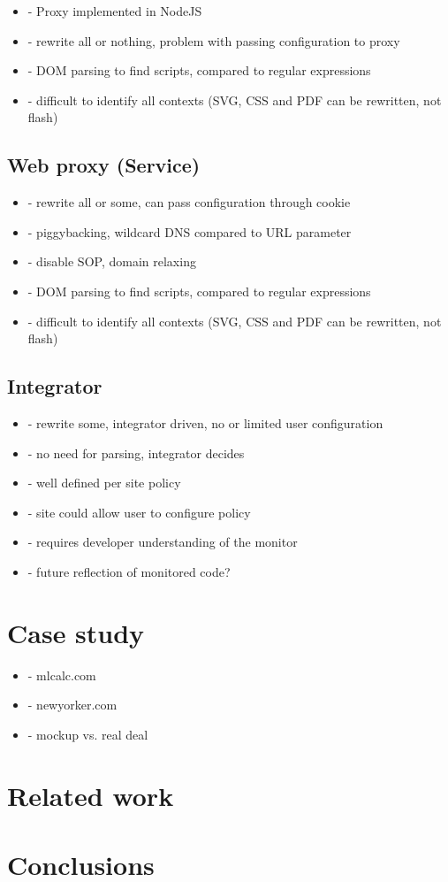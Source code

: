 \documentclass{llncs}
\begin{document}
\begin{itemize}
\item- Proxy implemented in NodeJS
\item- rewrite all or nothing, problem with passing configuration to proxy
\item- DOM parsing to find scripts, compared to regular expressions
\item- difficult to identify all contexts (SVG, CSS and PDF can be rewritten, not flash)
\end{itemize}



\subsection{Web proxy (Service)}

\begin{itemize}
\item- rewrite all or some, can pass configuration through cookie
\item- piggybacking, wildcard DNS compared to URL parameter
\item- disable SOP, domain relaxing
\item- DOM parsing to find scripts, compared to regular expressions
\item- difficult to identify all contexts (SVG, CSS and PDF can be rewritten, not flash)
\end{itemize}

\subsection{Integrator}

\begin{itemize}
\item- rewrite some, integrator driven, no or limited user configuration
\item- no need for parsing, integrator decides
\item- well defined per site policy
\item- site could allow user to configure policy
\item- requires developer understanding of the monitor
\item- future reflection of monitored code?
\end{itemize}


\section{Case study}
\label{sec:case}

\begin{itemize}
\item- mlcalc.com
\item- newyorker.com
\item- mockup vs. real deal
\end{itemize}

\section{Related work}
\label{sec:related}

\section{Conclusions}
\label{sec:conc}



\end{document}
